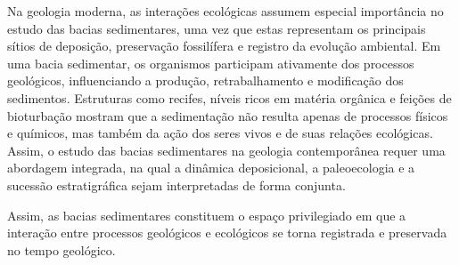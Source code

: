 Na geologia moderna, as interações ecológicas assumem especial importância no estudo das bacias sedimentares, uma vez que estas representam os principais sítios de deposição, preservação fossilífera e registro da evolução ambiental. Em uma bacia sedimentar, os organismos participam ativamente dos processos geológicos, influenciando a produção, retrabalhamento e modificação dos sedimentos. Estruturas como recifes, níveis ricos em matéria orgânica e feições de bioturbação mostram que a sedimentação não resulta apenas de processos físicos e químicos, mas também da ação dos seres vivos e de suas relações ecológicas. Assim, o estudo das bacias sedimentares na geologia contemporânea requer uma abordagem integrada, na qual a dinâmica deposicional, a paleoecologia e a sucessão estratigráfica sejam interpretadas de forma conjunta.

Assim, as bacias sedimentares constituem o espaço privilegiado em que a interação entre processos geológicos e ecológicos se torna registrada e preservada no tempo geológico.
